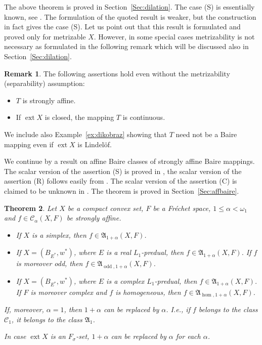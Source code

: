 \documentclass{amsart}
\numberwithin{equation}{section}
\newtheorem{thm}{Theorem}[section]
\theoremstyle{definition}
\newtheorem{remark}[thm]{Remark}
\def\fra{\mathfrak{A}}
\def\C{\mathcal C}
\def \ext {\operatorname{ext}}
\def\hom{\operatorname{hom}}
\def\odd{\operatorname{odd}}
\begin{document}
The above theorem is proved in Section~\ref{Sec:dilation}. The case (S) is essentially known, see \cite[Theorem 6.6]{lmnss03}.
The formulation of the quoted result is weaker, but the construction in fact gives the case (S). Let us point out that this result is formulated and proved only for metrizable $X$. However, in some special cases metrizability is not necessary as formulated in the following remark which will be discussed also in Section~\ref{Sec:dilation}.

\begin{remark}\label{rem:dilation} The following assertions hold even without the metrizability (separability) assumption:
\begin{itemize}
	\item $T$ is strongly affine.
	\item If $\ext X$ is closed, the mapping $T$ is continuous.
\end{itemize}
\end{remark}

We include also Example~\ref{ex:dikobraz} showing that $T$ need not be a Baire mapping even if $\ext X$ is Lindel\"of.

We continue by a result on affine Baire classes of strongly affine Baire mappings. The scalar version of the assertion (S) is proved in \cite[Theorem 2]{capon}, the scalar version of the assertion (R) follows easily from \cite[Theorem 1.4]{lusp}.
The scalar version of the assertion (C) is claimed to be unknown in \cite{lusp}. The theorem is proved in Section~\ref{Sec:affbaire}.

\begin{thm}\label{T:aff-baire} Let $X$ be a compact convex set, $F$ be a Fr\'echet space, $1\le\alpha<\omega_1$ and $f\in\C_\alpha(X,F)$ be strongly affine.
\begin{itemize}
\item[(S)] If $X$ is a simplex, then $f\in\fra_{1+\alpha}(X,F)$.
\item[(R)] If $X=(B_{E^*},w^*)$, where $E$ is a real $L_1$-predual, then $f\in\fra_{1+\alpha}(X,F)$. If $f$ is moreover odd, then $f\in\fra_{\odd, 1+\alpha}(X,F)$.
\item[(C)]  If $X=(B_{E^*},w^*)$, where $E$ is a complex $L_1$-predual, then $f\in\fra_{1+\alpha}(X,F)$. If $F$ is moreover complex and $f$ is homogeneous, then $f\in \fra_{\hom, 1+\alpha}(X, F)$.
\end{itemize}

If, moreover, $\alpha=1$, then $1+\alpha$ can be replaced by $\alpha$. I.e., if $f$ belongs to the class $\C_1$, it belongs to the class $\fra_1$.

In case $\ext X$ is an $F_\sigma$-set, $1+\alpha$ can be replaced by $\alpha$ for each $\alpha$.

\end{thm}
\end{document}
